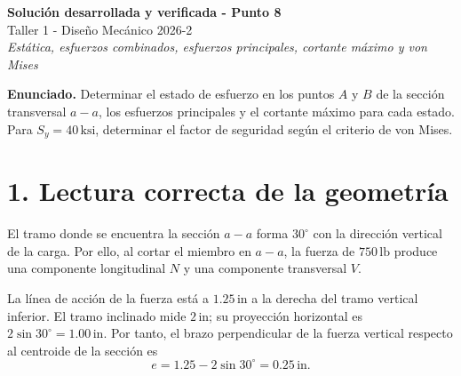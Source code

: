 \documentclass[11pt]{article}
\newcommand{\ksi}{\,\mathrm{ksi}}
\begin{document}
\begin{center}
{\Large\bfseries Soluci\'on desarrollada y verificada - Punto 8}\\[3pt]
{\large Taller 1 - Dise\~no Mec\'anico 2026-2}\\[6pt]
\textit{Est\'atica, esfuerzos combinados, esfuerzos principales, cortante m\'aximo y von Mises}
\end{center}

\begin{resultbox}
\textbf{Enunciado.} Determinar el estado de esfuerzo en los puntos $A$ y $B$ de la secci\'on transversal $a-a$, los esfuerzos principales y el cortante m\'aximo para cada estado. Para $S_y=40\ksi$, determinar el factor de seguridad seg\'un el criterio de von Mises.
\end{resultbox}

\section*{1. Lectura correcta de la geometr\'ia}

El tramo donde se encuentra la secci\'on $a-a$ forma $30^\circ$ con la direcci\'on vertical de la carga. Por ello, al cortar el miembro en $a-a$, la fuerza de $750\,\mathrm{lb}$ produce una componente longitudinal $N$ y una componente transversal $V$.

La l\'inea de acci\'on de la fuerza est\'a a $1.25\,\mathrm{in}$ a la derecha del tramo vertical inferior. El tramo inclinado mide $2\,\mathrm{in}$; su proyecci\'on horizontal es $2\sin30^\circ=1.00\,\mathrm{in}$. Por tanto, el brazo perpendicular de la fuerza vertical respecto al centroide de la secci\'on es
\[
e=1.25-2\sin30^\circ=0.25\,\mathrm{in}.
\]
\end{document}
